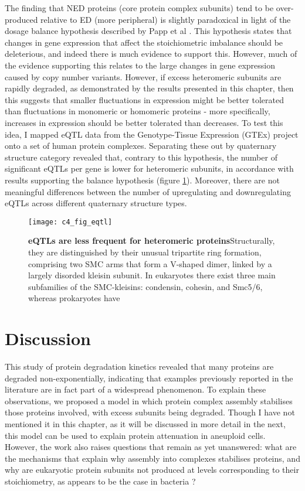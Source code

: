 \documentclass[a4paper,11pt,twoside,openright]{scrbook}
\begin{document}
The finding that NED proteins (core protein complex subunits) tend to be over-produced relative to ED (more peripheral) is slightly paradoxical in light of the dosage balance hypothesis described by Papp et al \cite{Papp2003}. This hypothesis states that changes in gene expression that affect the stoichiometric imbalance should be deleterious, and indeed there is much evidence to support this. However, much of the evidence supporting this relates to the large changes in gene expression caused by copy number variants. However, if excess heteromeric subunits are rapidly degraded, as demonstrated by the results presented in this chapter, then this suggests that smaller fluctuations in expression might be better tolerated than fluctuations in monomeric or homomeric proteins - more specifically, increases in expression should be better tolerated than decreases. To test this idea, I mapped eQTL data from the Genotype-Tissue Expression \cite{Brown2016} (GTEx) project onto a set of human protein complexes. Separating these out by quaternary structure category revealed that, contrary to this hypothesis, the number of significant eQTLs per gene is lower for heteromeric subunits, in accordance with results supporting the balance hypothesis (figure \ref{figure:eqtls}). Moreover, there are not meaningful differences between the number of upregulating and downregulating eQTLs across different quaternary structure types.

\begin{figure}[h]
\fcapsideright
    {\caption[eQTLs are less frequent for heteromeric proteins]{\sffamily\textbf{eQTLs are less frequent for heteromeric proteins}\newline \small Structurally, they are distinguished by their unusual tripartite ring formation, comprising two SMC arms that form a V-shaped dimer, linked by a largely disorded kleisin subunit. In eukaryotes there exist three main subfamilies of the SMC-kleisins: condensin, cohesin, and Smc5/6, whereas prokaryotes have }\label{figure:eqtls}}
    {\texttt{[image: c4\_fig\_eqtl]}}
\end{figure}

\section{Discussion}

This study of protein degradation kinetics revealed that many proteins are degraded non-exponentially, indicating that examples previously reported in the literature are in fact part of a widespread phenomenon. To explain these observations, we proposed a model in which protein complex assembly stabilises those proteins involved, with excess subunits being degraded. Though I have not mentioned it in this chapter, as it will be discussed in more detail in the next, this model can be used to explain protein attenuation in aneuploid cells. However, the work also raises questions that remain as yet unanswered: what are the mechanisms that explain why assembly into complexes stabilises proteins, and why are eukaryotic protein subunits not produced at levels corresponding to their stoichiometry, as appears to be the case in bacteria \cite{Li2014}?
\end{document}
